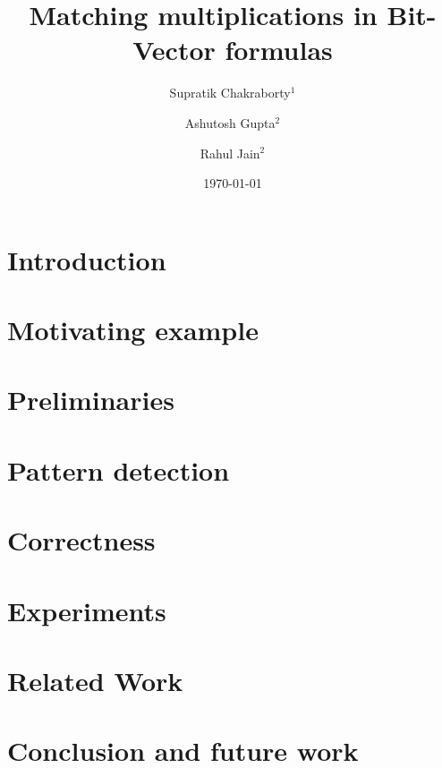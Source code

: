 \documentclass[draft]{llncs}
\begin{document}
\title{Matching multiplications in Bit-Vector formulas}

\author{Supratik Chakraborty$^1$ \and Ashutosh Gupta$^2$ \and Rahul Jain$^2$}


\date{\today}

\maketitle
\begin{abstract}

\end{abstract}

\section{Introduction}
\label{sec:intro}


\section{Motivating example}
\label{sec:motivating}


\section{Preliminaries}
\label{sec:prelim}


\section{Pattern detection}
\label{sec:pattern}


\section{Correctness}
\label{sec:correct}


\section{Experiments}
\label{sec:experiments}



\section{Related Work}
\label{sec:related}

\section{Conclusion and future work}
\label{sec:conclusion}




\end{document}
